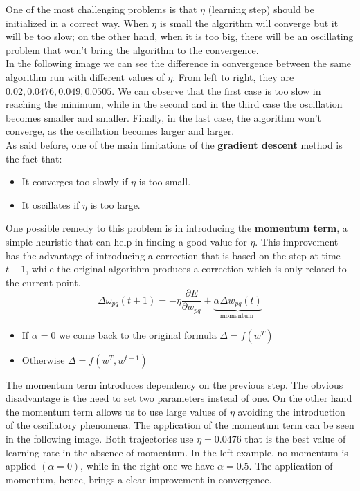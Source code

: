 One of the most challenging problems is that $\eta$ (learning step) should be initialized in a correct way. When $\eta$ is small the algorithm will converge but it will be too slow; on the other hand, when it is too big, there will be an oscillating problem that won't bring the algorithm to the convergence. \\
In the following image we can see the difference in convergence between the same algorithm run with different values of $\eta$. From left to right, they are $0.02, 0.0476, 0.049, 0.0505$.
We can observe that the first case is too slow in reaching the minimum, while in the second and in the third case the oscillation becomes smaller and smaller. Finally, in the last case, the algorithm won't converge, as the oscillation becomes larger and larger.\\
As said before, one of the main limitations of the \textbf{gradient descent} method is the fact that:
\begin{itemize}
	\item It converges too slowly if $\eta$ is too small.
	\item It oscillates if $\eta$ is too large.
\end{itemize}
One possible remedy to this problem is in introducing the \textbf{momentum term}, a simple heuristic that can help in finding a good value for $\eta$. This improvement has the advantage of introducing a correction that is based on the step at time $t-1$, while the original algorithm produces a correction which is only related to the current point.
$$\Delta \omega_{pq}(t+1) = -\eta \frac{\partial E}{\partial w_{pq}}+\underbrace{\alpha \Delta w_{pq} (t)}_{\text{momentum }}$$

\begin{itemize}
	\item If $\alpha = 0$ we come back to the original formula $\Delta = f(w^T)$
	\item Otherwise $\Delta = f(w^T, w^{t-1})$
\end{itemize}
The momentum term introduces dependency on the previous step. The obvious disadvantage is the need to set two parameters instead of one. On the other hand the momentum term allows us to use large values of $\eta$ avoiding the introduction of the oscillatory phenomena. The application of the momentum term can be seen in the following image.
Both trajectories use $\eta=0.0476$ that is the best value of learning rate in the absence of momentum. In the left example, no momentum is applied $(\alpha=0)$, while in the right one we have $\alpha=0.5$. The application of momentum, hence, brings a clear improvement in convergence.

